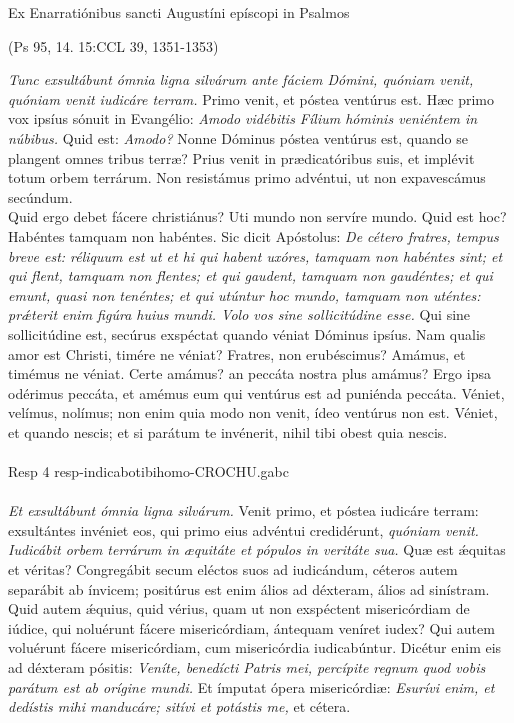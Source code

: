 \documentclass[options]{article}
\begin{document}
	Ex Enarratiónibus sancti Augustíni epíscopi in Psalmos
	\begin{flushright}
		 (Ps 95, 14. 15:CCL 39, 1351-1353)
	\end{flushright}
\emph{Tunc exsultábunt ómnia ligna silvárum ante fáciem Dómini, quóniam venit, quóniam venit iudicáre terram.} Primo venit, et póstea ventúrus est. Hæc primo vox ipsíus sónuit in Evangélio: \emph{Amodo vidébitis Fílium hóminis veniéntem in núbibus.}
Quid est: \emph{Amodo?}
Nonne Dóminus póstea ventúrus est, quando se plangent omnes tribus terræ? Prius venit in prædicatóribus suis, et implévit totum orbem terrárum. Non resistámus primo advéntui, ut non expavescámus secúndum.\\
 Quid ergo debet fácere christiánus? Uti mundo non servíre mundo. Quid est hoc? Habéntes tamquam non habéntes. Sic dicit Apóstolus: 
 \emph{De cétero fratres, tempus breve est: réliquum est ut et hi qui habent uxóres, tamquam non habéntes sint; et qui flent, tamquam non flentes; et qui gaudent, tamquam non gaudéntes; et qui emunt, quasi non tenéntes; et qui utúntur hoc mundo, tamquam non uténtes: pr\'{æ}terit enim figúra huius mundi. Volo vos sine sollicitúdine esse.}
 Qui sine sollicitúdine est, secúrus exspéctat quando véniat Dóminus ipsíus. Nam qualis amor est Christi, timére ne véniat? Fratres, non erubéscimus? Amámus, et timémus ne véniat. Certe amámus? an peccáta nostra plus amámus? Ergo ipsa odérimus peccáta, et amémus eum qui ventúrus est ad puniénda peccáta. Véniet, velímus, nolímus; non enim quia modo non venit, ídeo ventúrus non est. Véniet, et quando nescis; et si parátum te invénerit, nihil tibi obest quia nescis. \\
 \\
 Resp 4 resp-indicabotibihomo-CROCHU.gabc\\
 \\
 \emph{Et exsultábunt ómnia ligna silvárum.} Venit primo, et póstea iudicáre terram: exsultántes invéniet eos, qui primo eius advéntui credidérunt, \emph{quóniam venit.}\\
 \emph{Iudicábit orbem terrárum in æquitáte et pópulos in veritáte sua.} Quæ est \'{æ}quitas et véritas? Congregábit secum eléctos suos ad iudicándum, céteros autem separábit ab ínvicem; positúrus est enim álios ad déxteram, álios ad sinístram. Quid autem \'{æ}quius, quid vérius, quam ut non exspéctent misericórdiam de iúdice, qui noluérunt fácere misericórdiam, ántequam veníret iudex? Qui autem voluérunt fácere misericórdiam, cum misericórdia iudicabúntur. Dicétur enim eis ad déxteram pósitis: \emph{Veníte, benedícti Patris mei, percípite regnum quod vobis parátum est ab orígine mundi.} Et ímputat ópera misericórdiæ: \emph{Esurívi enim, et dedístis mihi manducáre; sitívi et potástis me,} et cétera. \\
\end{document}
